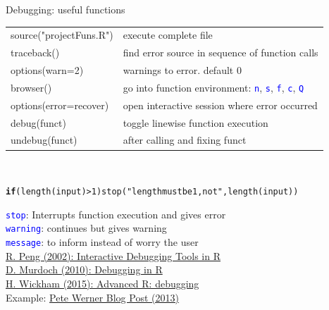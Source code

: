 \documentclass[xcolor=table,      handout ,    xcolor=dvipsnames]{beamer}\usepackage[]{graphicx}\usepackage[]{color}
\makeatletter
\newcommand{\hlnum}[1]{\textcolor[rgb]{0,0,0}{#1}}
\newcommand{\hlstr}[1]{\textcolor[rgb]{0.545,0.137,0.137}{#1}}
\newcommand{\hlopt}[1]{\textcolor[rgb]{0,0,0}{#1}}
\newcommand{\hlstd}[1]{\textcolor[rgb]{0,0,0}{#1}}
\newcommand{\hlkwa}[1]{\textcolor[rgb]{1,0,0}{\textbf{#1}}}
\newcommand{\hlkwd}[1]{\textcolor[rgb]{0,0,1}{#1}}
\newenvironment{kframe}{%
 \def\at@end@of@kframe{}%
 \ifinner\ifhmode%
  \def\at@end@of@kframe{\end{minipage}}%
  \begin{minipage}{\columnwidth}%
 \fi\fi%
 \def\FrameCommand##1{\hskip\@totalleftmargin \hskip-\fboxsep
 \colorbox{shadecolor}{##1}\hskip-\fboxsep
     \hskip-\linewidth \hskip-\@totalleftmargin \hskip\columnwidth}%
 \MakeFramed {\advance\hsize-\width
   \@totalleftmargin\z@ \linewidth\hsize
   \@setminipage}}%
 {\par\unskip\endMakeFramed%
 \at@end@of@kframe}
\newenvironment{knitrout}{}{} %
\newcommand{\rcode}[1]{\texttt{\textcolor{Blue}{#1}}}
\makeatother
\begin{document}

\begin{frame}[fragile]{Debugging: useful functions}
\begin{tabular}{ll}
\pause source("projectFuns.R") & execute complete file\\
\pause traceback() & find error source in sequence of function calls\\
\pause options(warn=2) & warnings to error. default 0\\
\pause browser() & go into function environment: \rcode{n}, \rcode{s}, \rcode{f}, \rcode{c}, \rcode{Q}\\
\pause \alert{options(error=recover)} & \alert{open interactive session where error occurred}\\
\pause debug(funct) & toggle linewise function execution\\
\pause undebug(funct) & after calling and fixing funct\\
\end{tabular}\\
\pause
\vspace{-0.5em}
\begin{knitrout}\footnotesize
{}\color{fgcolor}\begin{kframe}
\begin{alltt}
\hlkwa{if}\hlstd{(}\hlkwd{length}\hlstd{(input)}\hlopt{>}\hlnum{1}\hlstd{)} \hlkwd{stop}\hlstd{(}\hlstr{"length must be 1, not "}\hlstd{,} \hlkwd{length}\hlstd{(input))}
\end{alltt}
\end{kframe}
\end{knitrout}
\vspace{-1em}
\pause
\rcode{stop}: Interrupts function execution and gives error\\
\rcode{warning}: continues but gives warning\\
\rcode{message}: to inform instead of worry the user\\[1em]
\pause
\href{http://www.biostat.jhsph.edu/~rpeng/docs/R-debug-tools.pdf}{R. Peng (2002): Interactive Debugging Tools in R}\\
\href{https://www.stats.umanitoba.ca/files/statsweb/2011/03/debugging.pdf}{D. Murdoch (2010): Debugging in R}\\
\href{http://adv-r.had.co.nz/Exceptions-Debugging.html}{H. Wickham (2015): Advanced R: debugging}\\
Example: \href{https://www.r-bloggers.com/tracking-down-errors-in-r/}{Pete Werner Blog Post (2013)}
\end{frame}
\end{document}
